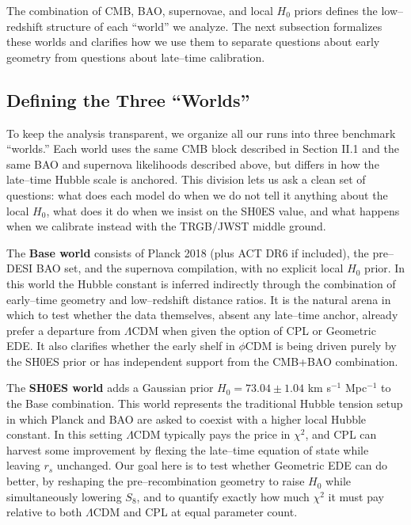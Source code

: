 \documentclass[a4paper,11pt]{article}
\begin{document}
The combination of CMB, BAO, supernovae, and local $H_0$ priors defines the low--redshift structure of each ``world'' we analyze. The next subsection formalizes these worlds and clarifies how we use them to separate questions about early geometry from questions about late--time calibration.


\subsection{Defining the Three ``Worlds''}
\label{sec:worlds}

To keep the analysis transparent, we organize all our runs into three benchmark ``worlds.'' Each world uses the same CMB block described in Section II.1 and the same BAO and supernova likelihoods described above, but differs in how the late--time Hubble scale is anchored. This division lets us ask a clean set of questions: what does each model do when we do not tell it anything about the local $H_0$, what does it do when we insist on the SH0ES value, and what happens when we calibrate instead with the TRGB/JWST middle ground.

The \textbf{Base world} consists of Planck 2018 (plus ACT DR6 if included), the pre--DESI BAO set, and the supernova compilation, with no explicit local $H_0$ prior. In this world the Hubble constant is inferred indirectly through the combination of early--time geometry and low--redshift distance ratios. It is the natural arena in which to test whether the data themselves, absent any late--time anchor, already prefer a departure from $\Lambda$CDM when given the option of CPL or Geometric EDE. It also clarifies whether the early shelf in $\phi$CDM is being driven purely by the SH0ES prior or has independent support from the CMB+BAO combination.

The \textbf{SH0ES world} adds a Gaussian prior $H_0 = 73.04 \pm 1.04$ km s$^{-1}$ Mpc$^{-1}$ to the Base combination. This world represents the traditional Hubble tension setup in which Planck and BAO are asked to coexist with a higher local Hubble constant. In this setting $\Lambda$CDM typically pays the price in $\chi^2$, and CPL can harvest some improvement by flexing the late--time equation of state while leaving $r_s$ unchanged. Our goal here is to test whether Geometric EDE can do better, by reshaping the pre--recombination geometry to raise $H_0$ while simultaneously lowering $S_8$, and to quantify exactly how much $\chi^2$ it must pay relative to both $\Lambda$CDM and CPL at equal parameter count.
\end{document}
